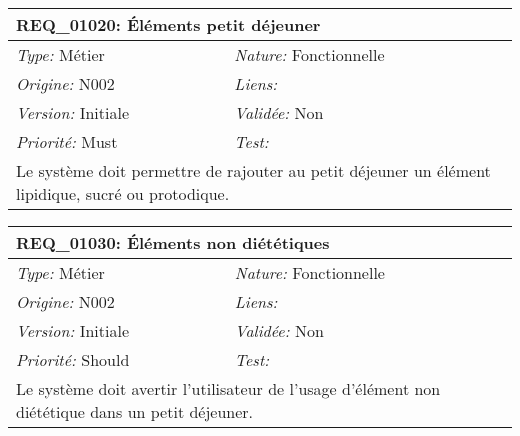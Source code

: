 \begin{table}[!h]

\begin{tabular}{|p{60mm}p{100mm}|}

\hline

\multicolumn{2}{|l|}{\textbf{REQ\_01020:} Éléments petit déjeuner} \\ \hline

\emph{Type:} Métier & \emph{Nature:} Fonctionnelle \\

\emph{Origine:} N002 & \emph{Liens:}  \\

\emph{Version:} Initiale & \emph{Validée:} Non \\

\emph{Priorité:} Must & \emph{Test:} \\ \hline

\multicolumn{2}{|p{16cm}|}{Le système doit permettre de rajouter au petit déjeuner un élément lipidique, sucré ou protodique.} \\ \hline

\end{tabular}

\end{table}



\begin{table}[!h]

\begin{tabular}{|p{60mm}p{100mm}|}

\hline

\multicolumn{2}{|l|}{\textbf{REQ\_01030:} Éléments non diététiques} \\ \hline

\emph{Type:} Métier & \emph{Nature:} Fonctionnelle \\

\emph{Origine:} N002 & \emph{Liens:}  \\

\emph{Version:} Initiale & \emph{Validée:} Non \\

\emph{Priorité:} Should & \emph{Test:} \\ \hline

\multicolumn{2}{|p{16cm}|}{Le système doit avertir l'utilisateur de l'usage d'élément non diététique dans un petit déjeuner.} \\ \hline

\end{tabular}

\end{table}



